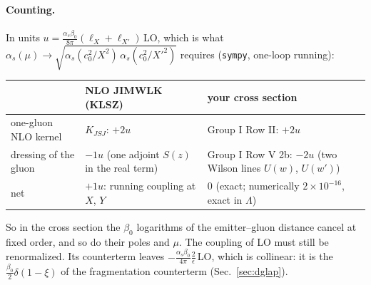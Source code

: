 \documentclass[10pt]{article}
\numberwithin{equation}{section}
\begin{document}
\paragraph{Counting.} In units $u=\frac{\alpha_s\beta_0}{8\pi}(\ell_X+\ell_{X'})\,$LO, which is what $\alpha_s(\mu)\to\sqrt{\alpha_s(c_0^2/X^2)\,\alpha_s(c_0^2/X'^2)}$ requires (\texttt{sympy}, one-loop running):
\begin{table}[H]\centering\small
\begin{tabular}{@{}lll@{}}\toprule
 & NLO JIMWLK (KLSZ) & your cross section\\\midrule
one-gluon NLO kernel & $K_{JSJ}$: $+2u$ & Group I Row II: $+2u$\\
dressing of the gluon & $-1u$ (one adjoint $S(z)$ in the real term) & Group I Row V 2b: $-2u$ (two Wilson lines $U(w)$, $U(w')$)\\
net & $+1u$: running coupling at $X$, $Y$ & $0$ (exact; numerically $2\times10^{-16}$, exact in $\Lambda$)\\\bottomrule
\end{tabular}
\end{table}
\noindent So in the cross section the $\beta_0$ logarithms of the emitter--gluon distance cancel at fixed order, and so do their poles and $\mu$. The coupling of LO must still be renormalized. Its counterterm leaves $-\frac{\alpha_s\beta_0}{4\pi}\frac2\epsilon\,$LO, which is collinear: it is the $\frac{\beta_0}{2}\delta(1-\xi)$ of the fragmentation counterterm (Sec.~\ref{sec:dglap}).
\end{document}
